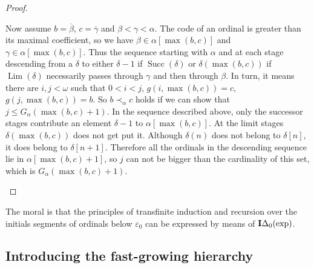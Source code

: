 \documentclass[8pt]{article}
\theoremstyle{definition}
\theoremstyle{definition}
\theoremstyle{definition}
\theoremstyle{definition}
\theoremstyle{definition}
\theoremstyle{definition}
\theoremstyle{definition}
\theoremstyle{definition}
\theoremstyle{definition}
\theoremstyle{definition}
\theoremstyle{definition}
\theoremstyle{definition}
\theoremstyle{definition}
\theoremstyle{question}
\begin{document}
\begin{proof}
\begin{enumerate}
    Now assume $b = \overline{\beta}$, $c = \overline{\gamma}$ and $\beta < \gamma < \alpha$.
    The code of an ordinal is greater than its maximal coefficient, so we have
    $\beta \in \alpha[\max(b,c)]$ and $\gamma \in \alpha[\max(b,c)]$. Thus the sequence starting
    with $\alpha$ and at each stage descending from a $\delta$ to either $\delta - 1$ if
    $\operatorname{Succ}(\delta)$ or $\delta(\max(b,c))$ if $\operatorname{Lim}(\delta)$ necessarily 
    passes through $\gamma$ and then through $\beta$.
    In turn, it means there are $i, j < \omega$ such that $0 < i < j$, $g(i, \max(b, c)) = c$, $g(j, \max(b, c)) = b$.
    So $b \prec_{\alpha} c$ holds if we can show that $j \leq G_{\alpha}(\max(b,c) + 1)$.
    In the sequence described above, only the successor stages contribute an element $\delta - 1$ to
    $\alpha[\max(b,c)]$. At the limit stages $\delta(\max(b, c))$ does not get put it.
    Although $\delta(n)$ does not belong to $\delta[n]$, it does belong to $\delta[n + 1]$.
    Therefore all the ordinals in the descending sequence lie in $\alpha[\max(b,c) + 1]$, so $j$ can not be bigger
    than the cardinality of this set, which is $G_{\alpha}(\max(b,c) + 1)$.
  \end{enumerate}
\end{proof}

The moral is that the principles of transfinite induction and recursion over the initials segments of ordinals below
$\varepsilon_0$ can be expressed by means of ${\bf I}\Delta_0(\operatorname{exp})$.

\subsection{Introducing the fast-growing hierarchy}
\end{document}
